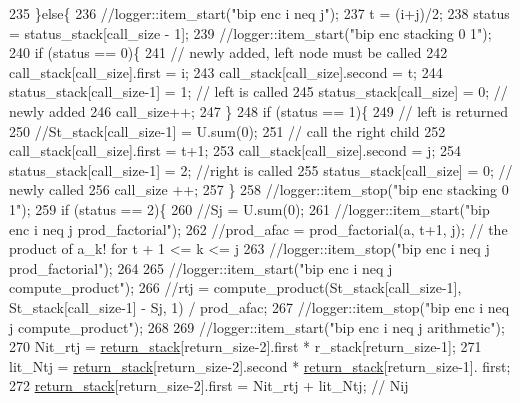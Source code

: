 \begin{DoxyCode}
235     \}\textcolor{keywordflow}{else}\{
236       \textcolor{comment}{//logger::item\_start("bip enc i neq j");}
237       t = (i+j)/2;
238       status = status\_stack[call\_size - 1];
239       \textcolor{comment}{//logger::item\_start("bip enc stacking 0 1");}
240       \textcolor{keywordflow}{if} (status == 0)\{
241         \textcolor{comment}{// newly added, left node must be called}
242         call\_stack[call\_size].first = i;
243         call\_stack[call\_size].second = t;
244         status\_stack[call\_size-1] = 1; \textcolor{comment}{// left is called}
245         status\_stack[call\_size] = 0; \textcolor{comment}{// newly added}
246         call\_size++;
247       \}
248       \textcolor{keywordflow}{if} (status == 1)\{
249         \textcolor{comment}{// left is returned}
250         \textcolor{comment}{//St\_stack[call\_size-1] = U.sum(0);}
251         \textcolor{comment}{// call the right child}
252         call\_stack[call\_size].first = t+1;
253         call\_stack[call\_size].second = j;
254         status\_stack[call\_size-1] = 2; \textcolor{comment}{//right is called}
255         status\_stack[call\_size] = 0;  \textcolor{comment}{// newly called}
256         call\_size ++;
257       \}
258       \textcolor{comment}{//logger::item\_stop("bip enc stacking 0 1");}
259       \textcolor{keywordflow}{if} (status == 2)\{
260         \textcolor{comment}{//Sj = U.sum(0);}
261         \textcolor{comment}{//logger::item\_start("bip enc i neq j prod\_factorial");}
262         \textcolor{comment}{//prod\_afac = prod\_factorial(a, t+1, j); // the product of a\_k! for t + 1 <= k <= j}
263         \textcolor{comment}{//logger::item\_stop("bip enc i neq j prod\_factorial");}
264 
265         \textcolor{comment}{//logger::item\_start("bip enc i neq j compute\_product");}
266         \textcolor{comment}{//rtj = compute\_product(St\_stack[call\_size-1], St\_stack[call\_size-1] - Sj, 1) / prod\_afac;}
267         \textcolor{comment}{//logger::item\_stop("bip enc i neq j compute\_product");}
268 
269         \textcolor{comment}{//logger::item\_start("bip enc i neq j arithmetic");}
270         Nit\_rtj = \hyperlink{namespacehelper__vars_a6d2100c373830cacd232319a9958652d}{return\_stack}[return\_size-2].first * r\_stack[return\_size-1]; 
271         lit\_Ntj = \hyperlink{namespacehelper__vars_a6d2100c373830cacd232319a9958652d}{return\_stack}[return\_size-2].second * \hyperlink{namespacehelper__vars_a6d2100c373830cacd232319a9958652d}{return\_stack}[return\_size-1].
      first;
272         \hyperlink{namespacehelper__vars_a6d2100c373830cacd232319a9958652d}{return\_stack}[return\_size-2].first = Nit\_rtj + lit\_Ntj; \textcolor{comment}{// Nij}

\end{DoxyCode}
